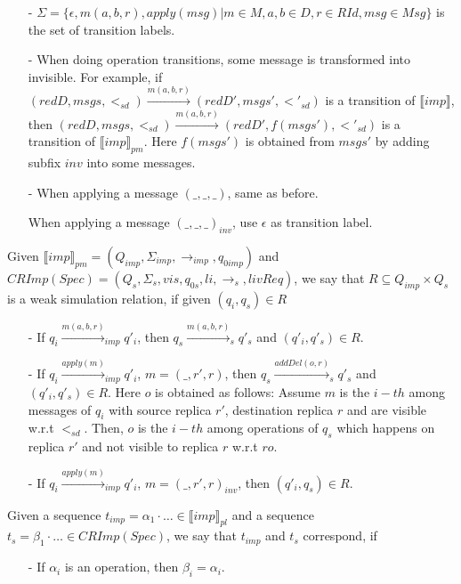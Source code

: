 {\begin{itemize}
\item[-] $\Sigma = \{ \epsilon, m(a,b,r), apply(msg) \vert m \in M, a,b \in D, r \in RId, msg \in Msg \}$ is the set of transition labels.

\item[-] When doing operation transitions, some message is transformed into invisible. For example, if $(redD,msgs,<_{sd}) {\xrightarrow{m(a,b,r)}} (redD',msgs',<'_{sd})$ is a transition of $\llbracket imp \rrbracket$, then $(redD,msgs,<_{sd}) {\xrightarrow{m(a,b,r)}} (redD',f(msgs'),<'_{sd})$ is a transition of $\llbracket imp \rrbracket_{pm}$. Here $f(msgs')$ is obtained from $msgs'$ by adding subfix $inv$ into some messages.
\item[-] When applying a message $(\_,\_,\_)$, same as before.

When applying a message $(\_,\_,\_)_{inv}$, use $\epsilon$ as transition label.
\end{itemize}


Given $\llbracket imp \rrbracket_{pm} = (Q_{imp},\Sigma_{imp},\rightarrow_{imp},q_{0imp})$ and $CRImp(Spec) = (Q_s,\Sigma_s,vis,q_{0s},li,\rightarrow_s,livReq)$, we say that $R \subseteq Q_{imp} \times Q_s$ is a weak simulation relation, if given $(q_i,q_s) \in R$

\begin{itemize}
\setlength{\itemsep}{0.5pt}
\item[-] If $q_i {\xrightarrow{m(a,b,r)}}_{imp} q'_i$, then $q_s {\xrightarrow{m(a,b,r)}}_s q'_s$ and $(q'_i,q'_s) \in R$.

\item[-] If $q_i {\xrightarrow{apply(m)}}_{imp} q'_i$, $m=(\_,r',r)$, then $q_s {\xrightarrow{addDel(o,r)}}_s q'_s$ and $(q'_i,q'_s) \in R$. Here $o$ is obtained as follows: Assume $m$ is the $i-th$ among messages of $q_i$ with source replica $r'$, destination replica $r$ and are visible w.r.t $<_{sd}$. Then, $o$ is the $i-th$ among operations of $q_s$ which happens on replica $r'$ and not visible to replica $r$ w.r.t $ro$.

\item[-] If $q_i {\xrightarrow{apply(m)}}_{imp} q'_i$, $m=(\_,r',r)_{inv}$, then $(q'_i,q_s) \in R$.
\end{itemize}


Given a sequence $t_{imp} = \alpha_1 \cdot \ldots \in \llbracket imp \rrbracket_{pl}$ and a sequence $t_s = \beta_1 \cdot \ldots \in CRImp(Spec)$, we say that $t_{imp}$ and $t_s$ correspond, if

\begin{itemize}
\setlength{\itemsep}{0.5pt}
\item[-] If $\alpha_i$ is an operation, then $\beta_i = \alpha_i$.


\end{itemize}}
